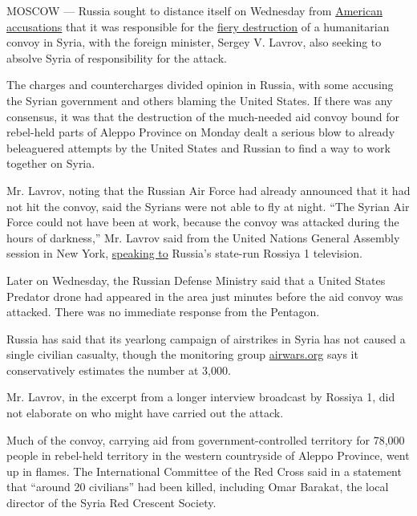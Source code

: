 MOSCOW --- Russia sought to distance itself on Wednesday from
\href{http://www.nytimes.com/2016/09/21/world/middleeast/syria-cease-fire.html}{American
accusations} that it was responsible for the
\href{http://www.nytimes.com/2016/09/20/world/middleeast/syria-aid-john-kerry.html}{fiery
destruction} of a humanitarian convoy in Syria, with the foreign
minister, Sergey V. Lavrov, also seeking to absolve Syria of
responsibility for the attack.

The charges and countercharges divided opinion in Russia, with some
accusing the Syrian government and others blaming the United States. If
there was any consensus, it was that the destruction of the much-needed
aid convoy bound for rebel-held parts of Aleppo Province on Monday dealt
a serious blow to already beleaguered attempts by the United States and
Russian to find a way to work together on Syria.

Mr. Lavrov, noting that the Russian Air Force had already announced that
it had not hit the convoy, said the Syrians were not able to fly at
night. ``The Syrian Air Force could not have been at work, because the
convoy was attacked during the hours of darkness,'' Mr. Lavrov said from
the United Nations General Assembly session in New York,
\href{http://www.vesti.ru/doc.html?id=2801245\#/video/https\%3A\%2F\%2Fplayer.vgtrk.com\%2Fiframe\%2Fvideo\%2Fid\%2F1573627\%2Fstart_zoom\%2Ftrue\%2FshowZoomBtn\%2Ffalse\%2Fsid\%2Fvesti\%2FisPlay\%2Ftrue\%2F\%3Facc_video_id\%3D692408}{speaking
to} Russia's state-run Rossiya 1 television.

Later on Wednesday, the Russian Defense Ministry said that a United
States Predator drone had appeared in the area just minutes before the
aid convoy was attacked. There was no immediate response from the
Pentagon.

Russia has said that its yearlong campaign of airstrikes in Syria has
not caused a single civilian casualty, though the monitoring group
\href{http://airwars.org/}{airwars.org} says it conservatively estimates
the number at 3,000.

Mr. Lavrov, in the excerpt from a longer interview broadcast by Rossiya
1, did not elaborate on who might have carried out the attack.

Much of the convoy, carrying aid from government-controlled territory
for 78,000 people in rebel-held territory in the western countryside of
Aleppo Province, went up in flames. The International Committee of the
Red Cross said in a statement that ``around 20 civilians'' had been
killed, including Omar Barakat, the local director of the Syria Red
Crescent Society.

